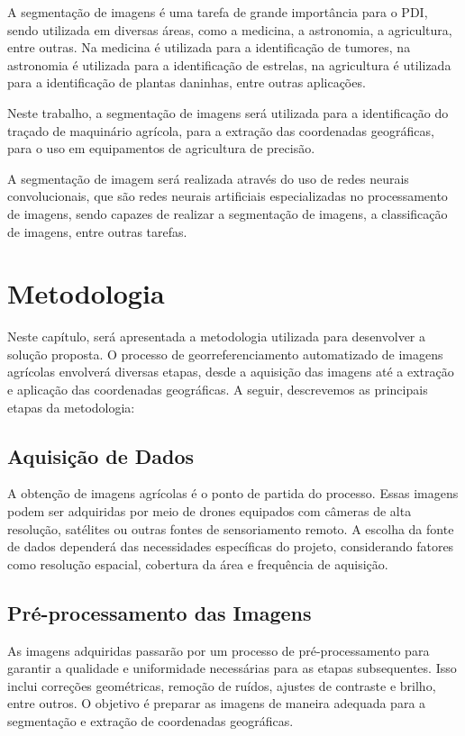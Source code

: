 \documentclass[conference]{IEEEtran}
\begin{document}
A segmentação de imagens é uma tarefa de grande importância para o PDI, sendo utilizada em diversas áreas, como a medicina,
a astronomia, a agricultura, entre outras. Na medicina é utilizada para a identificação de tumores, na astronomia é utilizada
para a identificação de estrelas, na agricultura é utilizada para a identificação de plantas daninhas, entre outras aplicações.

Neste trabalho, a segmentação de imagens será utilizada para a identificação do traçado de maquinário agrícola, para a
extração das coordenadas geográficas, para o uso em equipamentos de agricultura de precisão.

A segmentação de imagem será realizada através do uso de redes neurais convolucionais, que são redes neurais artificiais
especializadas no processamento de imagens, sendo capazes de realizar a segmentação de imagens, a classificação de imagens,
entre outras tarefas.

\section{Metodologia}
Neste capítulo, será apresentada a metodologia utilizada para desenvolver a solução proposta. 
O processo de georreferenciamento automatizado de imagens agrícolas envolverá diversas etapas, 
desde a aquisição das imagens até a extração e aplicação das coordenadas geográficas. 
A seguir, descrevemos as principais etapas da metodologia:

\subsection{Aquisição de Dados}

A obtenção de imagens agrícolas é o ponto de partida do processo. 
Essas imagens podem ser adquiridas por meio de drones equipados com câmeras de alta resolução, 
satélites ou outras fontes de sensoriamento remoto. A escolha da fonte de dados dependerá das 
necessidades específicas do projeto, considerando fatores como resolução espacial, 
cobertura da área e frequência de aquisição.

\subsection{Pré-processamento das Imagens}
As imagens adquiridas passarão por um processo de pré-processamento para garantir a qualidade 
e uniformidade necessárias para as etapas subsequentes. Isso inclui correções geométricas, 
remoção de ruídos, ajustes de contraste e brilho, entre outros. O objetivo é preparar as 
imagens de maneira adequada para a segmentação e extração de coordenadas geográficas.
\end{document}
